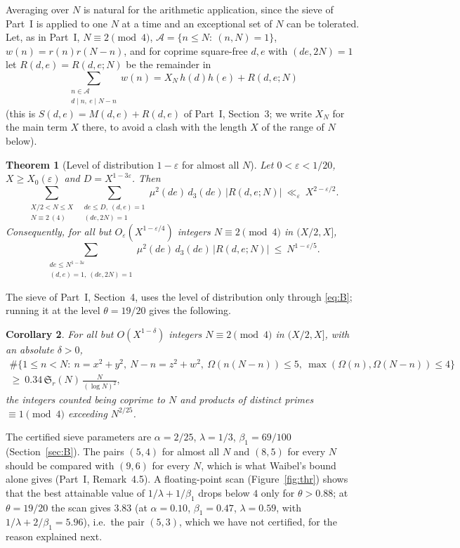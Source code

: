 ﻿\documentclass[11pt]{amsart}
\newtheorem{theorem}{Theorem}[section]
\newtheorem{corollary}[theorem]{Corollary}
\theoremstyle{remark}
\newcommand{\cA}{\mathcal{A}}
\newcommand{\Sg}{\mathfrak{S}}
\newcommand{\e}{\varepsilon}
\begin{document}
Averaging over $N$ is natural for the arithmetic application, since the sieve of Part~I is applied to one $N$ at a time and an exceptional set of $N$ can be tolerated. Let, as in Part~I, $N\equiv2\pmod4$, $\cA=\{n\le N:\ (n,N)=1\}$, $w(n)=r(n)r(N-n)$, and for coprime square-free $d,e$ with $(de,2N)=1$ let $R(d,e)=R(d,e;N)$ be the remainder in
\[
\sum_{\substack{n\in\cA\\ d\mid n,\ e\mid N-n}}w(n)=X_N\,h(d)h(e)+R(d,e;N)
\]
(this is $S(d,e)=M(d,e)+R(d,e)$ of Part~I, Section~3; we write $X_N$ for the main term $X$ there, to avoid a clash with the length $X$ of the range of $N$ below).

\begin{theorem}[Level of distribution $1-\e$ for almost all $N$]\label{thm:B}
Let $0<\e<1/20$, $X\ge X_0(\e)$ and $D=X^{1-3\e}$. Then
\[
\sum_{\substack{X/2<N\le X\\ N\equiv2\ (4)}}\ \sum_{\substack{de\le D,\ (d,e)=1\\ (de,2N)=1}}\mu^2(de)\,d_3(de)\,|R(d,e;N)|\ \ll_\e\ X^{2-\e/2}.
\]
Consequently, for all but $O_\e(X^{1-\e/4})$ integers $N\equiv2\pmod4$ in $(X/2,X]$,
\begin{equation}\label{eq:B}
\sum_{\substack{de\le N^{1-3\e}\\ (d,e)=1,\ (de,2N)=1}}\mu^2(de)\,d_3(de)\,|R(d,e;N)|\ \le\ N^{1-\e/5}.
\end{equation}
\end{theorem}

The sieve of Part~I, Section~4, uses the level of distribution only through \eqref{eq:B}; running it at the level $\theta=19/20$ gives the following.

\begin{corollary}\label{cor:C}
For all but $O(X^{1-\delta})$ integers $N\equiv2\pmod 4$ in $(X/2,X]$, with an absolute $\delta>0$,
\begin{multline*}
\#\bigl\{1\le n<N:\ n=x^2+y^2,\ N-n=z^2+w^2,\ \Omega(n(N-n))\le 5,\ \max(\Omega(n),\Omega(N-n))\le 4\bigr\}\\
\ge\ 0.34\,\Sg_r(N)\,\frac{N}{(\log N)^2},
\end{multline*}
the integers counted being coprime to $N$ and products of distinct primes $\equiv1\pmod4$ exceeding $N^{2/25}$.
\end{corollary}

The certified sieve parameters are $\alpha=2/25$, $\lambda=1/3$, $\beta_1=69/100$ (Section~\ref{sec:B}). The pairs $(5,4)$ for almost all $N$ and $(8,5)$ for every $N$ should be compared with $(9,6)$ for every $N$, which is what Waibel's bound alone gives (Part~I, Remark~4.5). A floating-point scan (Figure~\ref{fig:thr}) shows that the best attainable value of $1/\lambda+1/\beta_1$ drops below $4$ only for $\theta>0.88$; at $\theta=19/20$ the scan gives $3.83$ (at $\alpha=0.10$, $\beta_1=0.47$, $\lambda=0.59$, with $1/\lambda+2/\beta_1=5.96$), i.e.\ the pair $(5,3)$, which we have not certified, for the reason explained next.
\end{document}
